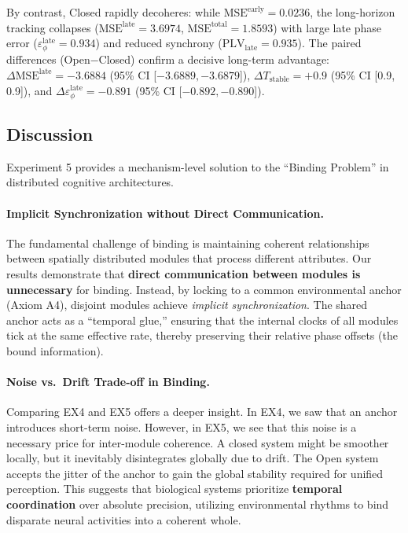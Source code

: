 \documentclass{article}
\begin{document}
By contrast, Closed rapidly decoheres: while $\mathrm{MSE}^{\mathrm{early}}=0.0236$,
the long-horizon tracking collapses ($\mathrm{MSE}^{\mathrm{late}}=3.6974$, $\mathrm{MSE}^{\mathrm{total}}=1.8593$) with large late phase error ($\varepsilon_{\phi}^{\mathrm{late}}=0.934$) and reduced synchrony ($\mathrm{PLV}_{\mathrm{late}}=0.935$).
The paired differences (Open$-$Closed) confirm a decisive long-term advantage:
$\Delta \mathrm{MSE}^{\mathrm{late}}=-3.6884$ (95\% CI [$-3.6889, -3.6879$]),
$\Delta T_{\mathrm{stable}}=+0.9$ (95\% CI [0.9, 0.9]),
and $\Delta \varepsilon_{\phi}^{\mathrm{late}}=-0.891$ (95\% CI [$-0.892, -0.890$]).

\subsection{Discussion}

Experiment 5 provides a mechanism-level solution to the ``Binding Problem'' in distributed cognitive architectures.

\paragraph{Implicit Synchronization without Direct Communication.}
The fundamental challenge of binding is maintaining coherent relationships between spatially distributed modules that process different attributes. Our results demonstrate that \textbf{direct communication between modules is unnecessary} for binding. Instead, by locking to a common environmental anchor (Axiom A4), disjoint modules achieve \textit{implicit synchronization}. The shared anchor acts as a ``temporal glue,'' ensuring that the internal clocks of all modules tick at the same effective rate, thereby preserving their relative phase offsets (the bound information).

\paragraph{Noise vs.\ Drift Trade-off in Binding.}
Comparing EX4 and EX5 offers a deeper insight. In EX4, we saw that an anchor introduces short-term noise. However, in EX5, we see that this noise is a necessary price for inter-module coherence. A closed system might be smoother locally, but it inevitably disintegrates globally due to drift. The Open system accepts the jitter of the anchor to gain the global stability required for unified perception. This suggests that biological systems prioritize \textbf{temporal coordination} over absolute precision, utilizing environmental rhythms to bind disparate neural activities into a coherent whole.
\end{document}
